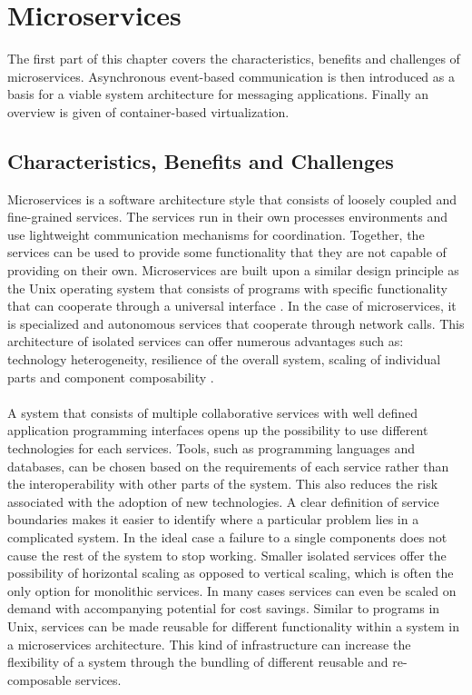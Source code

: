 \chapter{Microservices}
\label{chapter:microservices}

The first part of this chapter covers the characteristics, benefits and challenges of microservices. Asynchronous event-based communication is then introduced as a basis for a viable system architecture for messaging applications. Finally an overview is given of container-based virtualization.

\section{Characteristics, Benefits and Challenges}

Microservices is a software architecture style that consists of loosely coupled and fine-grained services. The services run in their own processes environments and use lightweight communication mechanisms for coordination. Together, the services can be used to provide some functionality that they are not capable of providing on their own. Microservices are built upon a similar design principle as the Unix operating system that consists of programs with specific functionality that can cooperate through a universal interface \cite{raymond2003art}. In the case of microservices, it is specialized and autonomous services that cooperate through network calls. This architecture of isolated services can offer numerous advantages such as: technology heterogeneity, resilience of the overall system, scaling of individual parts and component composability \cite{newman2015building}.
\\ \\
A system that consists of multiple collaborative services with well defined application programming interfaces opens up the possibility to use different technologies for each services. Tools, such as programming languages and databases, can be chosen based on the requirements of each service rather than the interoperability with other parts of the system. This also reduces the risk associated with the adoption of new technologies. A clear definition of service boundaries makes it easier to identify where a particular problem lies in a complicated system. In the ideal case a failure to a single components does not cause the rest of the system to stop working. Smaller isolated services offer the possibility of horizontal scaling as opposed to vertical scaling, which is often the only option for monolithic services. In many cases services can even be scaled on demand with accompanying potential for cost savings. Similar to programs in Unix, services can be made reusable for different functionality within a system in a microservices architecture. This kind of infrastructure can increase the flexibility of a system through the bundling of different reusable and re-composable services.
